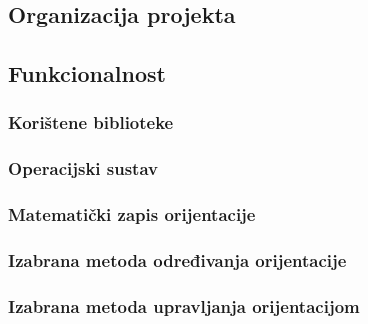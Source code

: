 \documentclass[times, utf8, diplomski, numeric]{templates/template}
\begin{document}
{{        \subsection{Organizacija projekta}{
            \iffalse
            - objasniti organizaciju koda
            \fi
        }
        
        \subsection{Funkcionalnost}{
            \subsubsection{Korištene biblioteke}{
                \iffalse
                - koje biblioteke koristimo i zasto
                \fi
            }

            \subsubsection{Operacijski sustav}{
                \iffalse
                - opisati da koristimo FreeRTOS
                - opisati koje sve dretve imamo
                    - za svaku dretvu napisati dijagram toka
                    - opisati funkciju dretve
                    - opisati vrijeme izvodjenja dretvi
                    - opisati na koji nacin dretve medjusobno komuniciraju
                \fi
            }

            \subsubsection{Matematički zapis orijentacije}{
                \iffalse
                - jednadzbe koje koristimo u SW
                \fi
            }
        
            \subsubsection{Izabrana metoda određivanja orijentacije}{
                \iffalse
                - objasniti na koji nacin radimo senzor fuzion
                    - optimal request
                        - napisati nesto kratko o OR algoritmu
                        - navesti referencu na svu popratnu dokumentaciju
                \fi
            }
        
            \subsubsection{Izabrana metoda upravljanja orijentacijom}{
                \iffalse
                - odabrana metoda upravljanja orijentacijom
                    - spomeni quaternion regulator
                - odabrana metoda upravljanja kutnom brzinom
                    - spomeni zamasnjak
                    - pwm
                    - spomeni PID regulator
                    - PID regulator za kontrolu orijentacije satelita
                        - opisati kako ga mi koristimo
                        - ovo isto pokupi od Arduino projekta
                \fi
            }
        }

}}
\end{document}

